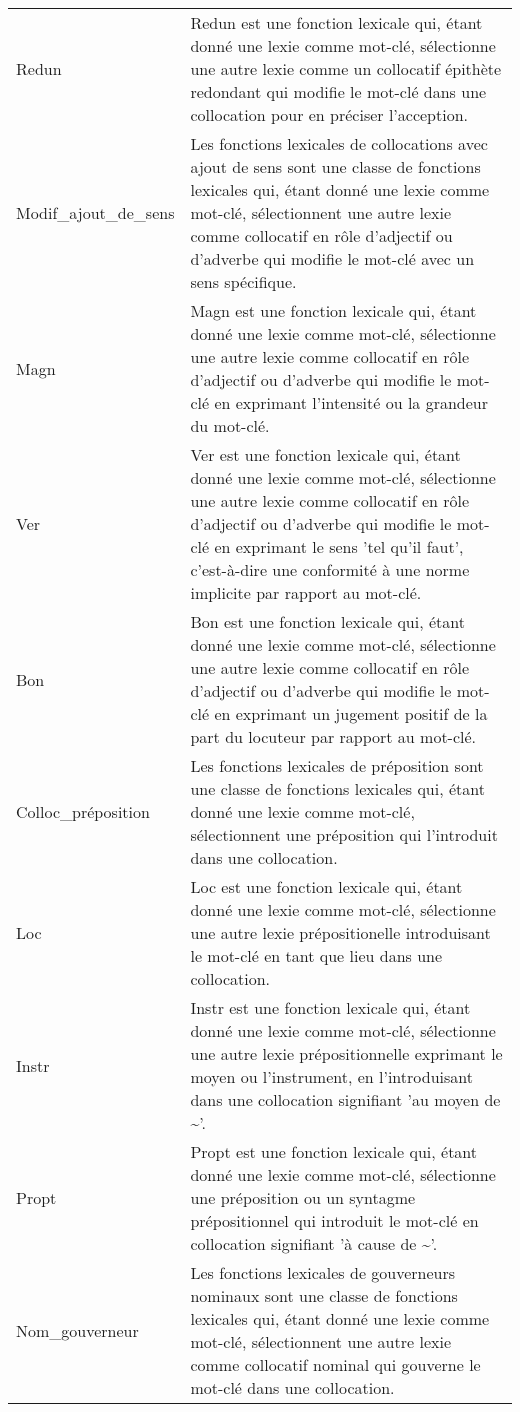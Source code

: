 \begin{longtable}{ll}
Redun & Redun est une fonction lexicale qui, étant donné une lexie comme mot-clé, sélectionne une autre lexie comme un collocatif épithète redondant qui modifie le mot-clé dans une collocation pour en préciser l'acception. \\
Modif\_ajout\_de\_sens & Les fonctions lexicales de collocations avec ajout de sens sont une classe de fonctions lexicales qui, étant donné une lexie comme mot-clé, sélectionnent une autre lexie comme collocatif en rôle d'adjectif ou d'adverbe qui modifie le mot-clé avec un sens spécifique. \\
Magn & Magn est une fonction lexicale qui, étant donné une lexie comme mot-clé, sélectionne une autre lexie comme collocatif en rôle d'adjectif ou d'adverbe qui modifie le mot-clé en exprimant l'intensité ou la grandeur du mot-clé. \\
Ver & Ver est une fonction lexicale qui, étant donné une lexie comme mot-clé, sélectionne une autre lexie comme collocatif en rôle d'adjectif ou d'adverbe qui modifie le mot-clé en exprimant le sens 'tel qu'il faut', c'est-à-dire une conformité à une norme implicite par rapport au mot-clé. \\
Bon & Bon est une fonction lexicale qui, étant donné une lexie comme mot-clé, sélectionne une autre lexie comme collocatif en rôle d'adjectif ou d'adverbe qui modifie le mot-clé en exprimant un jugement positif de la part du locuteur par rapport au mot-clé. \\
Colloc\_préposition & Les fonctions lexicales de préposition sont une classe de fonctions lexicales qui, étant donné une lexie comme mot-clé, sélectionnent une préposition qui l'introduit dans une collocation. \\
Loc & Loc est une fonction lexicale qui, étant donné une lexie comme mot-clé, sélectionne une autre lexie prépositionelle introduisant le mot-clé en tant que lieu dans une collocation. \\
Instr & Instr est une fonction lexicale qui, étant donné une lexie comme mot-clé, sélectionne une autre lexie prépositionnelle exprimant le moyen ou l'instrument, en l'introduisant dans une collocation signifiant 'au moyen de \textasciitilde '. \\
Propt & Propt est une fonction lexicale qui, étant donné une lexie comme mot-clé, sélectionne une préposition ou un syntagme prépositionnel qui introduit le mot-clé en collocation signifiant 'à cause de \textasciitilde '. \\
Nom\_gouverneur & Les fonctions lexicales de gouverneurs nominaux sont une classe de fonctions lexicales qui, étant donné une lexie comme mot-clé, sélectionnent une autre lexie comme collocatif nominal qui gouverne le mot-clé dans une collocation. \\

\end{longtable}
